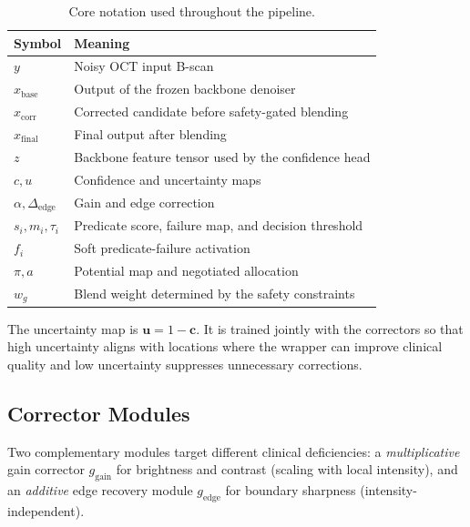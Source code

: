 \documentclass{ieeetj}
\begin{document}
\begin{table}[t]
\centering
\caption{Core notation used throughout the pipeline.}
\label{tab:notation}
\setlength{\tabcolsep}{3pt}
\footnotesize
\begin{tabular}{lp{}}
\toprule
Symbol & Meaning \\
\midrule
$y$ & Noisy OCT input B-scan \\
$\hat{x}_{\text{base}}$ & Output of the frozen backbone denoiser \\
$\hat{x}_{\text{corr}}$ & Corrected candidate before safety-gated blending \\
$\hat{x}_{\text{final}}$ & Final output after blending \\
$z$ & Backbone feature tensor used by the confidence head \\
$c,u$ & Confidence and uncertainty maps \\
$\alpha, \Delta_{\mathrm{edge}}$ & Gain and edge correction \\
$s_i,m_i,\tau_i$ & Predicate score, failure map, and decision threshold \\
$f_i$ & Soft predicate-failure activation \\
$\pi,a$ & Potential map and negotiated allocation \\
$w_g$ & Blend weight determined by the safety constraints \\
\bottomrule
\end{tabular}
\end{table}

The uncertainty map is $\mathbf{u}=1-\mathbf{c}$. It is trained jointly with the correctors so that high uncertainty aligns with locations where the wrapper can improve clinical quality and low uncertainty suppresses unnecessary corrections.

\subsection{Corrector Modules}
\label{sec:corrector_modules}
Two complementary modules target different clinical deficiencies: a \emph{multiplicative} gain corrector $g_{\mathrm{gain}}$ for brightness and contrast (scaling with local intensity), and an \emph{additive} edge recovery module $g_\text{edge}$ for boundary sharpness (intensity-independent).
\end{document}
